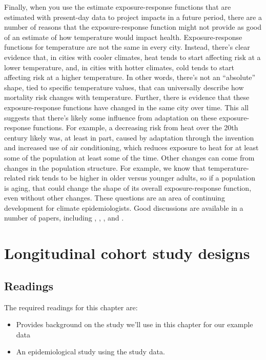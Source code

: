 \documentclass[
]{book}
\begin{document}
Finally, when you use the estimate exposure-response functions that are estimated with present-day data to project impacts in a future period, there are a number of reasons that the exposure-response function might not provide as good of an estimate of how temperature would impact health. Exposure-response functions for temperature are not the same in every city. Instead, there's clear evidence that, in cities with cooler climates, heat tends to start affecting risk at a lower temperature, and, in cities with hotter climates, cold tends to start affecting risk at a higher temperature. In other words, there's not an ``absolute'' shape, tied to specific temperature values, that can universally describe how mortality risk changes with temperature. Further, there is evidence that these exposure-response functions have changed in the same city over time. This all suggests that there's likely some influence from adaptation on these exposure-response functions. For example, a decreasing risk from heat over the 20th century likely was, at least in part, caused by adaptation through the invention and increased use of air conditioning, which reduces exposure to heat for at least some of the population at least some of the time. Other changes can come from changes in the population structure. For example, we know that temperature-related risk tends to be higher in older versus younger adults, so if a population is aging, that could change the shape of its overall exposure-response function, even without other changes. These questions are an area of continuing development for climate epidemiologists. Good discussions are available in a number of papers, including \citet{kinney2008approaches}, \citet{arbuthnott2016changes}, \citet{gosling2017adaptation}, and \citet{kinney2018temporal}.

\hypertarget{longitudinal-cohort-study-designs}{%
\chapter{Longitudinal cohort study designs}\label{longitudinal-cohort-study-designs}}

\hypertarget{readings-4}{%
\section{Readings}\label{readings-4}}

The required readings for this chapter are:

\begin{itemize}
\item
  \citet{andersson201970} Provides background on the study we'll use in this chapter for our example data
\item
  \citet{wong1989risk} An epidemiological study using the study data.
\end{itemize}
\end{document}
